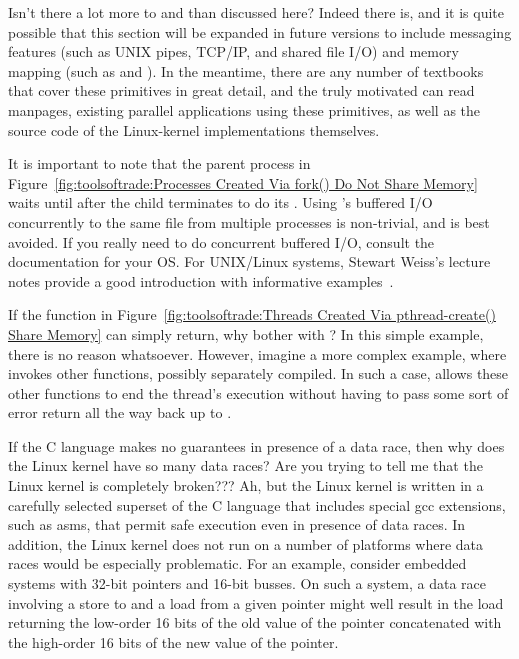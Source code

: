 \QuickQ{}
	Isn't there a lot more to  and 
	than discussed here?
\QuickA{}
	Indeed there is, and
	it is quite possible that this section will be expanded in
	future versions to include messaging features (such as UNIX
	pipes, TCP/IP, and shared file I/O) and memory mapping
	(such as  and ).
	In the meantime, there are any number of textbooks that cover
	these primitives in great detail,
	and the truly motivated can read manpages, existing parallel
	applications using these primitives, as well as the
	source code of the Linux-kernel implementations themselves.

	It is important to note that the parent process in
	Figure~\ref{fig:toolsoftrade:Processes Created Via fork() Do Not Share Memory}
	waits until after the child terminates to do its .
	Using 's buffered I/O concurrently to the same file
	from multiple processes is non-trivial, and is best avoided.
	If you really need to do concurrent buffered I/O,
	consult the documentation for your OS.
	For UNIX/Linux systems, Stewart Weiss's lecture notes provide
	a good introduction with informative
	examples~\cite{StewartWeiss2013UNIX}.

\QuickQ{}
	If the  function in
	Figure~\ref{fig:toolsoftrade:Threads Created Via pthread-create() Share Memory}
	can simply return, why bother with ?
\QuickA{}
	In this simple example, there is no reason whatsoever.
	However, imagine a more complex example, where 
	invokes other functions, possibly separately compiled.
	In such a case,  allows these other functions
	to end the thread's execution without having to pass some sort
	of error return all the way back up to .

\QuickQ{}
	If the C language makes no guarantees in presence of a data
	race, then why does the Linux kernel have so many data races?
	Are you trying to tell me that the Linux kernel is completely
	broken???
\QuickA{}
	Ah, but the Linux kernel is written in a carefully selected
	superset of the C language that includes special gcc
	extensions, such as asms, that permit safe execution even
	in presence of data races.
	In addition, the Linux kernel does not run on a number of
	platforms where data races would be especially problematic.
	For an example, consider embedded systems with 32-bit pointers
	and 16-bit busses.
	On such a system, a data race involving a store to and a load
	from a given pointer might well result in the load returning the
	low-order 16 bits of the old value of the pointer concatenated
	with the high-order 16 bits of the new value of the pointer.

